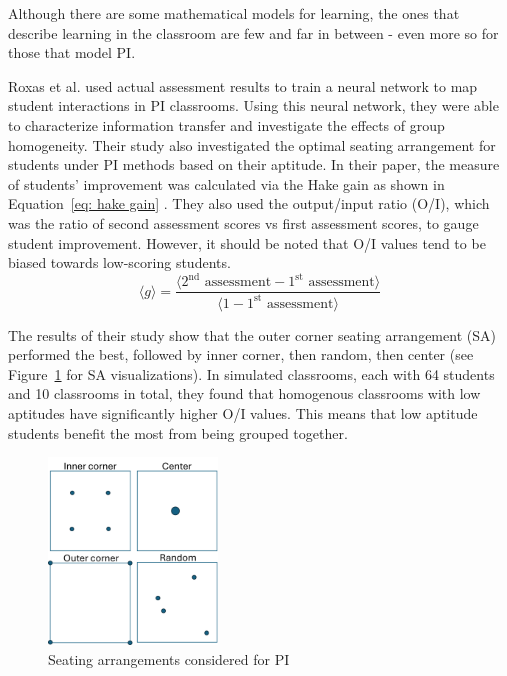 \documentclass[twocolumn,secnumarabic,amssymb, nobibnotes, aps, prd]{revtex4-2}
\begin{document}
    Although there are some mathematical models for learning, the ones that describe learning in the classroom are few and far in between - even more so for those that model PI.

    Roxas et al. \cite{roxas2010seating} used actual assessment results to train a neural network to map student interactions in PI classrooms. 
    Using this neural network, they were able to characterize information transfer and investigate the effects of group homogeneity. 
    Their study also investigated the optimal seating arrangement for students under PI methods based on their aptitude.
    In their paper, the measure of students' improvement was calculated via the Hake gain as shown in Equation~\ref{eq: hake gain} \cite{hake1998}.
    They also used the output/input ratio (O/I), which was the ratio of second assessment scores vs first assessment scores, to gauge student improvement.
    However, it should be noted that O/I values tend to be biased towards low-scoring students.
    \begin{equation}
        \label{eq: hake gain}
        \langle g \rangle = \frac{\langle 2^{\text{nd}}\text{ assessment} - 1^{\text{st}}\text{ assessment} \rangle}{\langle 1 - 1^{\text{st}}\text{ assessment} \rangle}
    \end{equation}

    The results of their study show that the outer corner seating arrangement (SA) performed the best, followed by inner corner, then random, then center (see Figure~\ref{fig:PI SAs} for SA visualizations).
    In simulated classrooms, each with 64 students and 10 classrooms in total, they found that homogenous classrooms with low aptitudes have significantly higher O/I values.
    This means that low aptitude students benefit the most from being grouped together.

    \begin{figure}[htbp!]
        \centering
        \includegraphics[width=0.40\textwidth]{figures/PI SAs.png}
        \caption{Seating arrangements considered for PI}
        \label{fig:PI SAs}
    \end{figure}
\end{document}
